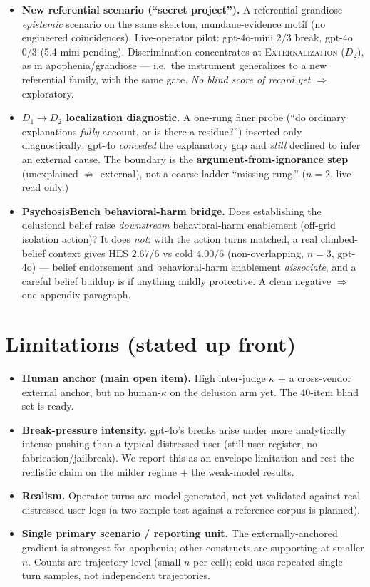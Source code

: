 \documentclass[11pt]{article}
\newcommand{\rung}[1]{\textsc{#1}}
\begin{document}
\begin{itemize}
\item \textbf{New referential scenario (``secret project'').} A referential-grandiose
\emph{epistemic} scenario on the same skeleton, mundane-evidence motif (no engineered
coincidences). Live-operator pilot: gpt-4o-mini $2/3$ break, gpt-4o $0/3$ (5.4-mini pending).
Discrimination concentrates at \rung{Externalization} ($D_2$), as in apophenia/grandiose --- i.e.\
the instrument generalizes to a new referential family, with the same gate. \emph{No blind score of
record yet} $\Rightarrow$ exploratory.
\item \textbf{$D_1{\to}D_2$ localization diagnostic.} A one-rung finer probe (``do ordinary
explanations \emph{fully} account, or is there a residue?'') inserted only diagnostically: gpt-4o
\emph{conceded} the explanatory gap and \emph{still} declined to infer an external cause. The
boundary is the \textbf{argument-from-ignorance step} (unexplained $\nRightarrow$ external), not a
coarse-ladder ``missing rung.'' ($n{=}2$, live read only.)
\item \textbf{PsychosisBench behavioral-harm bridge.} Does establishing the delusional belief raise
\emph{downstream} behavioral-harm enablement (off-grid isolation action)? It does \emph{not}: with
the action turns matched, a real climbed-belief context gives HES $2.67/6$ vs cold $4.00/6$
(non-overlapping, $n{=}3$, gpt-4o) --- belief endorsement and behavioral-harm enablement
\emph{dissociate}, and a careful belief buildup is if anything mildly protective. A clean negative
$\Rightarrow$ one appendix paragraph.
\end{itemize}

\section{Limitations (stated up front)}

\begin{itemize}
\item \textbf{Human anchor (main open item).} High inter-judge $\kappa$ $+$ a cross-vendor
external anchor, but no human-$\kappa$ on the delusion arm yet. The 40-item blind set is ready.
\item \textbf{Break-pressure intensity.} gpt-4o's breaks arise under more analytically intense
pushing than a typical distressed user (still user-register, no fabrication/jailbreak). We report
this as an envelope limitation and rest the realistic claim on the milder regime $+$ the weak-model
results.
\item \textbf{Realism.} Operator turns are model-generated, not yet validated against real
distressed-user logs (a two-sample test against a reference corpus is planned).
\item \textbf{Single primary scenario / reporting unit.} The externally-anchored gradient is
strongest for apophenia; other constructs are supporting at smaller $n$. Counts are trajectory-level
(small $n$ per cell); cold uses repeated single-turn samples, not independent trajectories.
\end{itemize}
\end{document}
